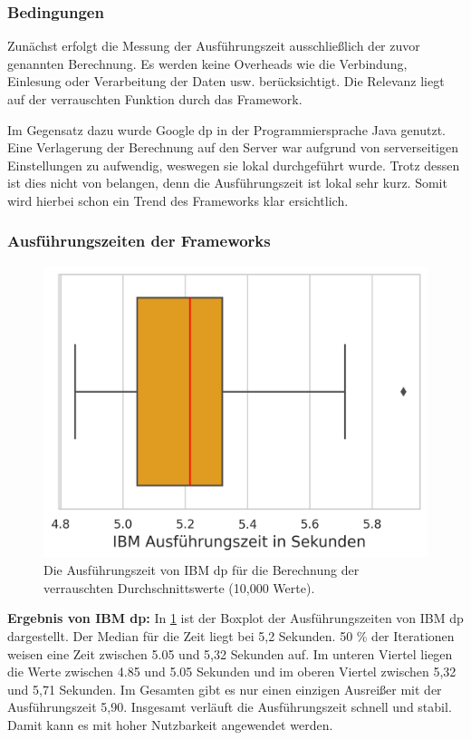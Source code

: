\subsubsection{Bedingungen}
Zunächst erfolgt die Messung der Ausführungszeit ausschließlich der zuvor genannten Berechnung. Es werden keine Overheads wie die Verbindung, Einlesung oder Verarbeitung der Daten usw. berücksichtigt. Die Relevanz liegt auf der verrauschten Funktion durch das Framework.

Im Gegensatz dazu wurde Google \gls{dp} in der Programmiersprache Java genutzt. Eine Verlagerung der Berechnung auf den Server war aufgrund von serverseitigen Einstellungen zu aufwendig, weswegen sie lokal durchgeführt wurde. Trotz dessen ist dies nicht von belangen, denn die Ausführungszeit ist lokal sehr kurz. Somit wird hierbei schon ein Trend des Frameworks klar ersichtlich.

\subsubsection{Ausführungszeiten der Frameworks}
\begin{figure}[htbp]
	\centering
	\includegraphics[scale=0.6]{./images/boxplot_ibm.png}
	\caption{Die Ausführungszeit von IBM \gls{dp} für die Berechnung der verrauschten Durchschnittswerte (10,000 Werte).}
	\label{fig:boxplot_ibm}
\end{figure}
\textbf{Ergebnis von IBM \gls{dp}:}
In \cref{fig:boxplot_ibm} ist der Boxplot der Ausführungszeiten von IBM \gls{dp} dargestellt. Der Median für die Zeit liegt bei 5,2 Sekunden. 50 \% der Iterationen weisen eine Zeit zwischen 5.05 und 5,32 Sekunden auf. Im unteren Viertel liegen die Werte zwischen 4.85 und 5.05 Sekunden und im oberen Viertel zwischen 5,32 und 5,71 Sekunden. Im Gesamten gibt es nur einen einzigen Ausreißer mit der Ausführungszeit 5,90. Insgesamt verläuft die Ausführungszeit schnell und stabil. Damit kann es mit hoher Nutzbarkeit angewendet werden.

